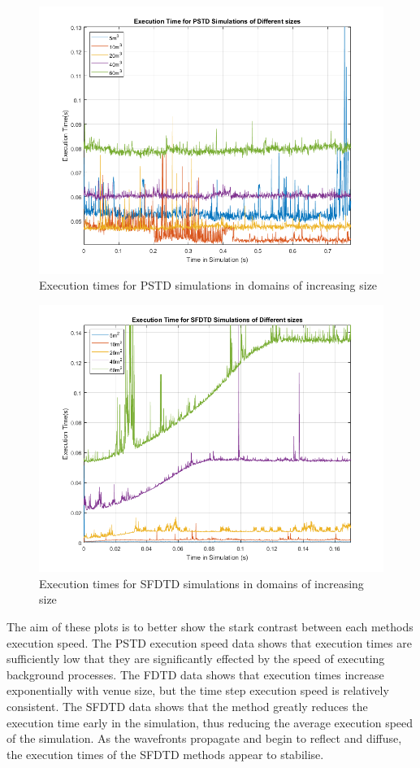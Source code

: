\begin{figure}[H]
\centering
  \includegraphics[width=\textwidth]{./graphics/PSTD Simulation Execution Times.png}
  \caption{Execution times for PSTD simulations in domains of increasing size}
\end{figure}

\begin{figure}[H]
\centering
  \includegraphics[width=\textwidth]{./graphics/SFDTD simulation execution time.png}
  \caption{Execution times for SFDTD simulations in domains of increasing size}
\end{figure}

The aim of these plots is to better show the stark contrast between each methods execution speed. The PSTD execution speed data shows that execution times are sufficiently low that they are significantly effected by the speed of executing background processes. The FDTD data shows that execution times increase exponentially with venue size, but the time step execution speed is relatively consistent. The SFDTD data shows that the method greatly reduces the execution time early in the simulation, thus reducing the average execution speed of the simulation. As the wavefronts propagate and begin to reflect and diffuse, the execution times of the SFDTD methods appear to stabilise.